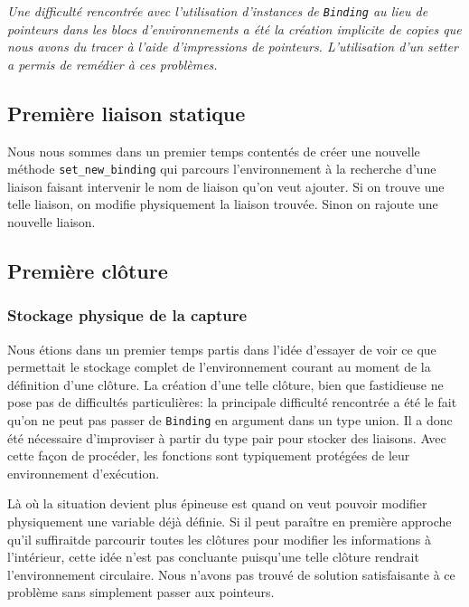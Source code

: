 \documentclass[a4paper,11pt]{article}
\newcommand{\dbend}{{\manual\char127}}
\newenvironment{attention}%
{\description\item[\dbend]\sl}%
{\enddescription}
\begin{document}
\begin{attention}
  Une difficulté rencontrée avec l'utilisation d'instances de \texttt{Binding}
  au lieu de pointeurs dans les blocs d'environnements a été la création
  implicite de copies que nous avons du tracer à l'aide d'impressions de
  pointeurs. L'utilisation d'un setter a permis de remédier à ces problèmes.
\end{attention}

\subsection{Première liaison statique}

Nous nous sommes dans un premier temps contentés de créer une nouvelle méthode
\texttt{set\_new\_binding} qui parcours l'environnement à la
recherche d'une liaison faisant intervenir le nom de liaison qu'on veut ajouter.
Si on trouve une telle liaison, on modifie physiquement la liaison trouvée.
Sinon on rajoute une nouvelle liaison.

\subsection{Première clôture}

\subsubsection{Stockage physique de la capture}

Nous étions dans un
premier temps partis dans l'idée d'essayer de voir ce que permettait le stockage complet de
l'environnement courant au moment de la définition d'une clôture. La création
d'une telle clôture, bien que fastidieuse ne pose pas de difficultés
particulières: la principale difficulté rencontrée a été le fait qu'on ne peut
pas passer de \texttt{Binding} en argument dans un type union. Il a donc été
nécessaire d'improviser à partir du type pair pour stocker des liaisons. Avec
cette façon de procéder, les fonctions sont typiquement protégées de leur
environnement d'exécution.

Là où la situation devient plus épineuse est quand on veut pouvoir modifier
physiquement une variable déjà définie. Si il peut paraître en première approche
qu'il \og suffirait\fg de parcourir toutes les clôtures pour modifier les
informations à l'intérieur, cette idée n'est pas concluante  puisqu'une telle clôture
rendrait l'environnement circulaire. Nous n'avons pas trouvé de solution
satisfaisante à ce problème sans simplement passer aux pointeurs.
\end{document}
